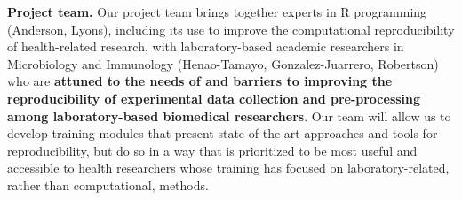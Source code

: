 \documentclass[pdftex,english,11.5pt,parskip=half]{scrartcl}
\begin{document}
\textbf{Project team.}  Our project team brings together experts in R programming (Anderson, Lyons), including its use to improve the computational reproducibility of health-related research, with laboratory-based academic researchers in Microbiology and Immunology (Henao-Tamayo, Gonzalez-Juarrero, Robertson) who are \textbf{attuned to the needs of and barriers to improving the reproducibility of experimental data collection and pre-processing among laboratory-based biomedical researchers}. Our team will allow us to develop training modules that present state-of-the-art approaches and tools for reproducibility, but do so in a way that is prioritized to be most useful and accessible to health researchers whose training has focused on laboratory-related, rather than computational, methods. 

\endgroup
\end{document}
